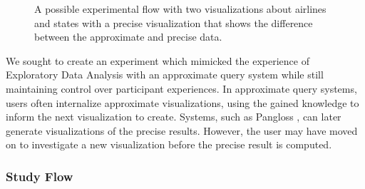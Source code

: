 \documentclass[10pt,journal,compsoc]{IEEEtran}
\begin{document}
\begin{figure}[!ht]
{\label{fig:seven}}
\hfil
{}
\hfil
{}
\hfil
{}

\caption{A possible experimental flow with two visualizations about airlines and states with a precise visualization that shows the difference between the approximate and precise data.}
\label{fig:example}
\end{figure}

We sought to create an experiment which mimicked the experience of Exploratory Data Analysis with an approximate query system while still maintaining control over participant experiences.
In approximate query systems, users often internalize approximate visualizations, using the gained knowledge to inform the next visualization to create.
Systems, such as Pangloss \cite{moritz2017pangloss}, can later generate visualizations of the precise results.
However, the user may have moved on to investigate a new visualization before the precise result is computed.

\subsubsection{Study Flow}
\end{document}
